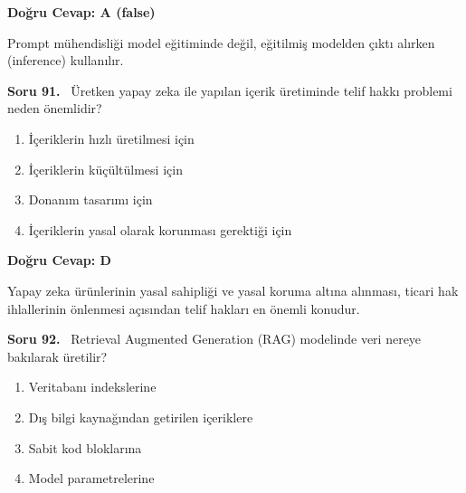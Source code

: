\documentclass[11pt,a4paper,openany]{book}
\begin{document}
\vspace{4pt}
\begin{tcolorbox}[title=Cevap ve Açıklama, colback=gray!3!white, colframe=primarycolor!90!black, arc=2mm, fonttitle=\bfseries\sffamily, top=6pt, bottom=6pt]
    \textbf{Doğru Cevap: A (false)}
    
    \vspace{2pt}
    Prompt mühendisliği model eğitiminde değil, eğitilmiş modelden çıktı alırken (inference) kullanılır.
\end{tcolorbox}
\vspace{10pt}
\needspace{5cm}
\vspace{8pt}
\noindent\textbf{\large\sffamily Soru 91.} \ Üretken yapay zeka ile yapılan içerik üretiminde telif hakkı problemi neden önemlidir?

\begin{enumerate}[label=\Alph*), leftmargin=25pt, topsep=4pt, itemsep=2pt]
        \item İçeriklerin hızlı üretilmesi için
        \item İçeriklerin küçültülmesi için
        \item Donanım tasarımı için
        \item İçeriklerin yasal olarak korunması gerektiği için
\end{enumerate}

\vspace{4pt}
\begin{tcolorbox}[title=Cevap ve Açıklama, colback=gray!3!white, colframe=primarycolor!90!black, arc=2mm, fonttitle=\bfseries\sffamily, top=6pt, bottom=6pt]
    \textbf{Doğru Cevap: D}
    
    \vspace{2pt}
    Yapay zeka ürünlerinin yasal sahipliği ve yasal koruma altına alınması, ticari hak ihlallerinin önlenmesi açısından telif hakları en önemli konudur.
\end{tcolorbox}
\vspace{10pt}
\needspace{5cm}
\vspace{8pt}
\noindent\textbf{\large\sffamily Soru 92.} \ Retrieval Augmented Generation (RAG) modelinde veri nereye bakılarak üretilir?

\begin{enumerate}[label=\Alph*), leftmargin=25pt, topsep=4pt, itemsep=2pt]
        \item Veritabanı indekslerine
        \item Dış bilgi kaynağından getirilen içeriklere
        \item Sabit kod bloklarına
        \item Model parametrelerine
\end{enumerate}
\end{document}
